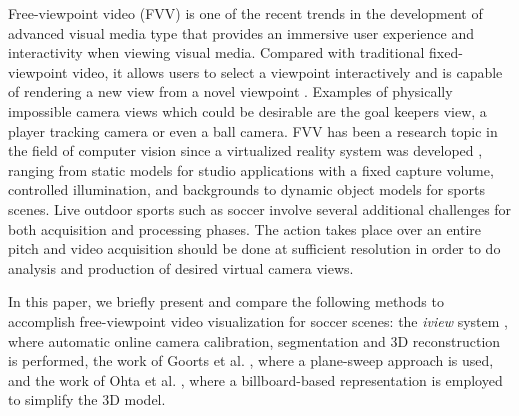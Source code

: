 Free-viewpoint video (FVV) is one of the recent trends in the development of advanced visual media type
that provides an immersive user experience and interactivity when viewing
visual media. Compared with traditional fixed-viewpoint
video, it allows users to select a viewpoint interactively and
is capable of rendering a new view from a novel viewpoint \cite{05_plane_sweeping}.
Examples of physically impossible camera views which
could be desirable are the goal keepers view, a player tracking camera or even a
ball camera.
FVV has been a research topic in the field of computer vision 
since a virtualized reality system was developed \cite{04_fast_FVV_01},
ranging from static models for studio applications with a fixed
capture volume, controlled illumination, and backgrounds \cite{02_iview} 
to dynamic object models for sports scenes.
Live outdoor sports such as soccer involve several additional challenges for both acquisition and processing 
phases. 
The action takes place over an entire pitch and video acquisition should be done at sufficient resolution in order to
do analysis and production of desired virtual camera views.


In this paper, we briefly present and compare the following methods to accomplish free-viewpoint video 
visualization for soccer scenes: the \textit{iview} system \cite{02_iview}, where automatic online camera calibration, 
segmentation and 3D reconstruction is performed,
the work of Goorts et al. \cite{05_plane_sweeping}, where a plane-sweep approach is used,
and the work of Ohta et al. \cite{03_billboard}, where a billboard-based representation is employed to simplify the 
3D model.


